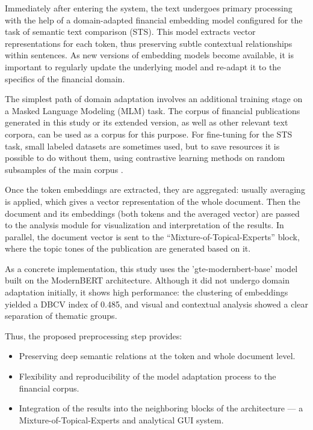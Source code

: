 Immediately after entering the system, the text undergoes primary processing with the help of a domain-adapted
financial embedding model configured for the task of semantic text comparison (STS). This model extracts vector
representations for each token, thus preserving subtle contextual relationships within sentences. As new versions
of embedding models become available, it is important to regularly update the underlying model and re-adapt it
to the specifics of the financial domain.

The simplest path of domain adaptation involves an additional training stage on a Masked Language Modeling (MLM)
task. The corpus of financial publications generated in this study or its extended version, as well as other relevant
text corpora, can be used as a corpus for this purpose. For fine-tuning for the STS task, small labeled datasets
are sometimes used, but to save resources it is possible to do without them, using contrastive learning methods
on random subsamples of the main corpus \parencite{gao2021simcse}.

Once the token embeddings are extracted, they are aggregated: usually averaging is applied, which gives a vector
representation of the whole document. Then the document and its embeddings (both tokens and the averaged vector)
are passed to the analysis module for visualization and interpretation of the results. In parallel, the document
vector is sent to the “Mixture-of-Topical-Experts” block, where the topic tones of the publication are generated
based on it.

As a concrete implementation, this study uses the 'gte-modernbert-base' model built on the ModernBERT architecture.
Although it did not undergo domain adaptation initially, it shows high performance: the clustering of embeddings
yielded a DBCV index of 0.485, and visual and contextual analysis showed a clear separation of thematic groups.

Thus, the proposed preprocessing step provides:

\begin{itemize}
    \item Preserving deep semantic relations at the token and whole document level.
    \item Flexibility and reproducibility of the model adaptation process to the financial corpus.
    \item Integration of the results into the neighboring blocks of the architecture --- a Mixture-of-Topical-Experts
    and analytical GUI system.
\end{itemize}

